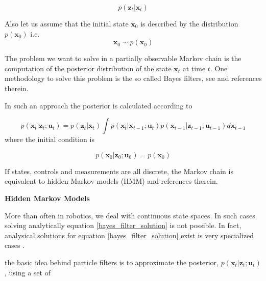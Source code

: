 \begin{equation}
p(\mathbf{z}_t | \mathbf{x}_{t}) 
\label{pf_measurement_model}
\end{equation}

Also let us assume that the  initial state $\mathbf{x}_0$ is described by the distribution $p(\mathbf{x}_0)$ i.e.
\begin{equation}
\mathbf{x}_0 \sim p(\mathbf{x}_0)
\end{equation}

The problem we want to solve in a partially observable Markov chain is the computation of the posterior distribution of the state
$\mathbf{x}_t$ at time $t$. One methodology to solve this problem is the so called Bayes filters, see \cite{Thurn2002}  and references therein.

In such an approach the posterior is calculated according to 

\begin{equation}
p(\mathbf{x}_t | \mathbf{z}_{t}; \mathbf{u}_{t}) = p(\mathbf{z}_t | \mathbf{x}_{t}) \int p(\mathbf{x}_t | \mathbf{x}_{t-1}; \mathbf{u}_{t}) p(\mathbf{x}_{t-1} | \mathbf{z}_{t-1}; \mathbf{u}_{t-1}) d \mathbf{x}_{t-1}
\label{bayes_filter_solution}   
\end{equation}
where the initial condition is

\begin{equation}
p(\mathbf{x}_0 | \mathbf{z}_{0}; \mathbf{u}_{0}) = p(\mathbf{x}_0) 
\end{equation}

If states, controls and measurements are all discrete, the Markov chain is equivalent to hidden Markov models (HMM) \cite{Thurn2002}  and references therein. 


\begin{framed}
\begin{remark}{\textbf{Hidden Markov Models}}

\end{remark}
\end{framed}

More than often in robotics, we deal with continuous state spaces. In such cases solving analytically equation \ref{bayes_filter_solution} is not possible.
In fact, analysical solutions for equation \ref{bayes_filter_solution} exist is very specialized cases \cite{Thurn2002}.


the basic idea behind particle filters is to approximate the posterior, $ p(\mathbf{x}_t | \mathbf{z}_{t}; \mathbf{u}_{t})$, using a
set of   


